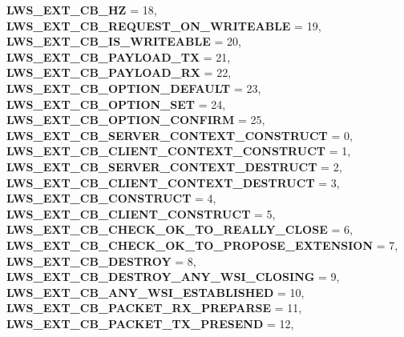 \begin{DoxyCompactItemize}
{\bfseries L\+W\+S\+\_\+\+E\+X\+T\+\_\+\+C\+B\+\_\+HZ} = 18, 
{\bfseries L\+W\+S\+\_\+\+E\+X\+T\+\_\+\+C\+B\+\_\+\+R\+E\+Q\+U\+E\+S\+T\+\_\+\+O\+N\+\_\+\+W\+R\+I\+T\+E\+A\+B\+LE} = 19, 
\newline
{\bfseries L\+W\+S\+\_\+\+E\+X\+T\+\_\+\+C\+B\+\_\+\+I\+S\+\_\+\+W\+R\+I\+T\+E\+A\+B\+LE} = 20, 
{\bfseries L\+W\+S\+\_\+\+E\+X\+T\+\_\+\+C\+B\+\_\+\+P\+A\+Y\+L\+O\+A\+D\+\_\+\+TX} = 21, 
{\bfseries L\+W\+S\+\_\+\+E\+X\+T\+\_\+\+C\+B\+\_\+\+P\+A\+Y\+L\+O\+A\+D\+\_\+\+RX} = 22, 
{\bfseries L\+W\+S\+\_\+\+E\+X\+T\+\_\+\+C\+B\+\_\+\+O\+P\+T\+I\+O\+N\+\_\+\+D\+E\+F\+A\+U\+LT} = 23, 
\newline
{\bfseries L\+W\+S\+\_\+\+E\+X\+T\+\_\+\+C\+B\+\_\+\+O\+P\+T\+I\+O\+N\+\_\+\+S\+ET} = 24, 
{\bfseries L\+W\+S\+\_\+\+E\+X\+T\+\_\+\+C\+B\+\_\+\+O\+P\+T\+I\+O\+N\+\_\+\+C\+O\+N\+F\+I\+RM} = 25, 
{\bfseries L\+W\+S\+\_\+\+E\+X\+T\+\_\+\+C\+B\+\_\+\+S\+E\+R\+V\+E\+R\+\_\+\+C\+O\+N\+T\+E\+X\+T\+\_\+\+C\+O\+N\+S\+T\+R\+U\+CT} = 0, 
{\bfseries L\+W\+S\+\_\+\+E\+X\+T\+\_\+\+C\+B\+\_\+\+C\+L\+I\+E\+N\+T\+\_\+\+C\+O\+N\+T\+E\+X\+T\+\_\+\+C\+O\+N\+S\+T\+R\+U\+CT} = 1, 
\newline
{\bfseries L\+W\+S\+\_\+\+E\+X\+T\+\_\+\+C\+B\+\_\+\+S\+E\+R\+V\+E\+R\+\_\+\+C\+O\+N\+T\+E\+X\+T\+\_\+\+D\+E\+S\+T\+R\+U\+CT} = 2, 
{\bfseries L\+W\+S\+\_\+\+E\+X\+T\+\_\+\+C\+B\+\_\+\+C\+L\+I\+E\+N\+T\+\_\+\+C\+O\+N\+T\+E\+X\+T\+\_\+\+D\+E\+S\+T\+R\+U\+CT} = 3, 
{\bfseries L\+W\+S\+\_\+\+E\+X\+T\+\_\+\+C\+B\+\_\+\+C\+O\+N\+S\+T\+R\+U\+CT} = 4, 
{\bfseries L\+W\+S\+\_\+\+E\+X\+T\+\_\+\+C\+B\+\_\+\+C\+L\+I\+E\+N\+T\+\_\+\+C\+O\+N\+S\+T\+R\+U\+CT} = 5, 
\newline
{\bfseries L\+W\+S\+\_\+\+E\+X\+T\+\_\+\+C\+B\+\_\+\+C\+H\+E\+C\+K\+\_\+\+O\+K\+\_\+\+T\+O\+\_\+\+R\+E\+A\+L\+L\+Y\+\_\+\+C\+L\+O\+SE} = 6, 
{\bfseries L\+W\+S\+\_\+\+E\+X\+T\+\_\+\+C\+B\+\_\+\+C\+H\+E\+C\+K\+\_\+\+O\+K\+\_\+\+T\+O\+\_\+\+P\+R\+O\+P\+O\+S\+E\+\_\+\+E\+X\+T\+E\+N\+S\+I\+ON} = 7, 
{\bfseries L\+W\+S\+\_\+\+E\+X\+T\+\_\+\+C\+B\+\_\+\+D\+E\+S\+T\+R\+OY} = 8, 
{\bfseries L\+W\+S\+\_\+\+E\+X\+T\+\_\+\+C\+B\+\_\+\+D\+E\+S\+T\+R\+O\+Y\+\_\+\+A\+N\+Y\+\_\+\+W\+S\+I\+\_\+\+C\+L\+O\+S\+I\+NG} = 9, 
\newline
{\bfseries L\+W\+S\+\_\+\+E\+X\+T\+\_\+\+C\+B\+\_\+\+A\+N\+Y\+\_\+\+W\+S\+I\+\_\+\+E\+S\+T\+A\+B\+L\+I\+S\+H\+ED} = 10, 
{\bfseries L\+W\+S\+\_\+\+E\+X\+T\+\_\+\+C\+B\+\_\+\+P\+A\+C\+K\+E\+T\+\_\+\+R\+X\+\_\+\+P\+R\+E\+P\+A\+R\+SE} = 11, 
{\bfseries L\+W\+S\+\_\+\+E\+X\+T\+\_\+\+C\+B\+\_\+\+P\+A\+C\+K\+E\+T\+\_\+\+T\+X\+\_\+\+P\+R\+E\+S\+E\+ND} = 12, 

\end{DoxyCompactItemize}
